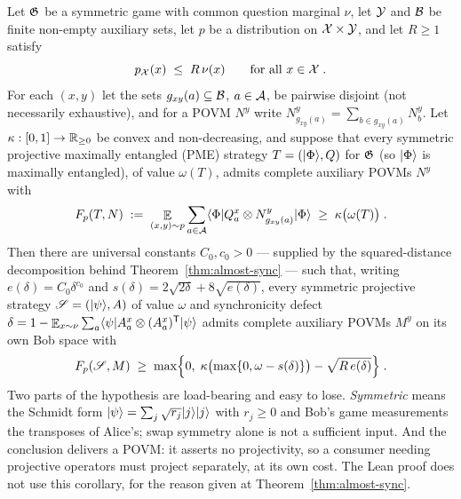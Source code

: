 \begin{corollary}
\label{cor:sync-transfer}
Let $\mathfrak{G}$ be a symmetric game with common question marginal $\nu$, let $\mathcal{Y}$ and $\mathcal{B}$ be
finite non-empty auxiliary sets, let $p$ be a distribution on $\mathcal{X} \times \mathcal{Y}$, and let
$R \geq 1$ satisfy
\begin{equation*}
  p_{\mathcal{X}}(x) \;\leq\; R\, \nu(x) \qquad \text{for all } x \in \mathcal{X}\;.
\end{equation*}
For each $(x,y)$ let the sets $g_{xy}(a) \subseteq \mathcal{B}$, $a \in \mathcal{A}$, be pairwise disjoint
(not necessarily exhaustive), and for a POVM $N^y$ write
$N^y_{g_{xy}(a)} = \sum_{b \in g_{xy}(a)} N^y_b$. Let $\kappa : [0,1] \to \mathbb{R}_{\geq 0}$ be
convex and non-decreasing, and suppose that every symmetric projective maximally
entangled (PME) strategy $T = (|\Phi\rangle, Q)$ for $\mathfrak{G}$ (so $|\Phi\rangle$ is
maximally entangled), of value $\omega(T)$, admits complete auxiliary POVMs $N^y$ with
\begin{equation*}
  F_p(T, N) \;:=\; \mathop{\mathbb{E}}_{(x,y) \sim p} \sum_{a \in \mathcal{A}}
    \langle\Phi| Q^x_a \otimes N^y_{g_{xy}(a)} |\Phi\rangle \;\geq\; \kappa\bigl( \omega(T) \bigr)\;.
\end{equation*}
Then there are universal constants $C_0, c_0 > 0$ --- supplied by the squared-distance
decomposition behind Theorem~\ref{thm:almost-sync} --- such that, writing
$e(\delta) = C_0 \delta^{c_0}$ and $s(\delta) = 2\sqrt{2\delta} + 8\sqrt{e(\delta)}$, every
symmetric projective strategy $\mathscr{S} = (|\psi\rangle, A)$ of value $\omega$ and
synchronicity defect
$\delta = 1 - \mathop{\mathbb{E}}_{x \sim \nu} \sum_a \langle\psi| A^x_a \otimes (A^x_a)^{\mathsf{T}} |\psi\rangle$
admits complete auxiliary POVMs $M^y$ on its own Bob space with
\begin{equation*}
  F_p(\mathscr{S}, M) \;\geq\; \max\Bigl\{ 0,\;
    \kappa\bigl( \max\{0, \omega - s(\delta)\} \bigr) - \sqrt{R\, e(\delta)} \Bigr\}\;.
\end{equation*}
Two parts of the hypothesis are load-bearing and easy to lose. \emph{Symmetric} means the
Schmidt form $|\psi\rangle = \sum_j \sqrt{r_j} |j\rangle|j\rangle$ with $r_j \geq 0$ and Bob's game
measurements the transposes of Alice's; swap symmetry alone is not a sufficient input. And the
conclusion delivers a POVM: it asserts no projectivity, so a consumer needing projective
operators must project separately, at its own cost.
The Lean proof does not use this corollary, for the reason given at
Theorem~\ref{thm:almost-sync}.
\end{corollary}


